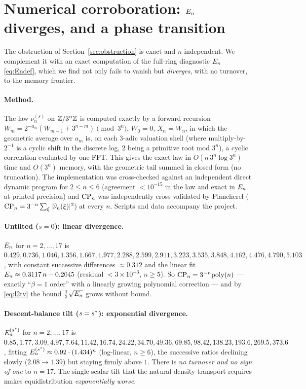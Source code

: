 \documentclass[11pt]{amsart}
\theoremstyle{definition}
\theoremstyle{remark}
\begin{document}
\section{Numerical corroboration: $E_n$ diverges, and a phase transition}
\label{sec:numerics}

The obstruction of Section~\ref{sec:obstruction} is exact and $n$-independent. We complement it with an
exact computation of the full-ring diagnostic $E_n$ \eqref{eq:Endef}, which we find not only fails to
vanish but \emph{diverges}, with no turnover, to the memory frontier.

\paragraph{Method.}
The law $\nu_n^{(s)}$ on $\mathbb{Z}/3^{n}\mathbb{Z}$ is computed exactly by a forward recursion
$W_m=2^{-a_m}(W_{m-1}+3^{n-m})\pmod{3^n}$, $W_0=0$, $X_n=W_n$, in which the geometric average over $a_m$
is, on each $3$-adic valuation shell (where multiply-by-$2^{-1}$ is a cyclic shift in the discrete log,
$2$ being a primitive root mod $3^n$), a cyclic correlation evaluated by one FFT. This gives the exact
law in $O(n\,3^n\log 3^n)$ time and $O(3^n)$ memory, with the geometric tail summed in closed form
(no truncation). The implementation was cross-checked against an independent direct dynamic program for
$2\le n\le 6$ (agreement $<10^{-15}$ in the law and exact in $E_n$ at printed precision) and
$\mathrm{CP}_n$ was independently cross-validated by Plancherel ($\mathrm{CP}_n=3^{-n}\sum_\xi|\widehat{\nu}_{n}(\xi)|^2$) at
every $n$. Scripts and data accompany the project.

\paragraph{Untilted ($s=0$): linear divergence.}
$E_n$ for $n=2,\dots,17$ is
$0.429,0.736,1.046,1.356,1.667,1.977,2.288,2.599,2.911,3.223,3.535,3.848,4.162,4.476,4.790,5.103$,
with constant successive differences $\approx0.312$ and the linear fit
$E_n\approx 0.3117\,n-0.2045$ (residual $<3\times10^{-3}$, $n\ge5$). So
$\mathrm{CP}_n=3^{-n}\mathrm{poly}(n)$ --- exactly ``$\beta=1$ order'' with a linearly growing polynomial
correction --- and by \eqref{eq:l2tv} the bound $\tfrac12\sqrt{E_n}$ grows without bound.

\paragraph{Descent-balance tilt ($s=s^{*}$): exponential divergence.}
$E_n^{(s^{*})}$ for $n=2,\dots,17$ is
$0.85,1.77,3.09,4.97,7.64,11.42,16.74,24.22,34.70,49.36,69.85,98.42,138.23,193.6,269.5,373.6$,
fitting $E_n^{(s^{*})}\approx 0.92\cdot(1.434)^n$ (log-linear, $n\ge6$), the successive ratios
declining slowly ($2.08\to1.39$) but staying firmly above $1$. There is \emph{no turnover and no sign of
one} to $n=17$. The single scalar tilt that the natural-density transport requires makes equidistribution
\emph{exponentially worse}.
\end{document}
